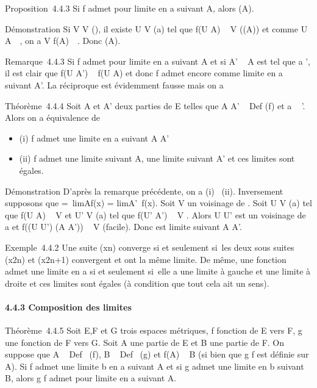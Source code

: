 Proposition~4.4.3 Si f admet \ell pour limite en a suivant A, alors \ell
\in\overlinef(A).

Démonstration Si V \in V (\ell), il existe U \in V (a) tel que f(U \bigcap A) \subset~ V
(\bigcapf(A)) et comme U \bigcap A\neq~\varnothing~, on a V \bigcap
f(A)\neq~\varnothing~. Donc \ell
\in\overlinef(A).

Remarque~4.4.3 Si f admet \ell pour limite en a suivant A et si A' \subset~ A est
tel que a \in\overlineA', il est clair que f(U \bigcap A') \subset~
f(U \bigcap A) et donc f admet encore \ell comme limite en a suivant A'. La
réciproque est évidemment fausse mais on a

Théorème~4.4.4 Soit A et A' deux parties de E telles que A \cup A'
\subset~ Def (f) et a \in\overlineA~
\bigcap\overlineA'. Alors on a équivalence de

\begin{itemize}
\itemsep1pt\parskip0pt
\item
  (i) f admet une limite en a suivant A \cup A'
\item
  (ii) f admet une limite suivant A, une limite suivant A' et ces
  limites sont égales.
\end{itemize}

Démonstration D'après la remarque précédente, on a (i) \rigtharrow~(ii).
Inversement supposons que \ell =\
limAf(x) = limA'~f(x). Soit
V un voisinage de \ell. Soit U \in V (a) tel que f(U \bigcap A) \subset~ V et U' \in V (a)
tel que f(U' \bigcap A') \subset~ V . Alors U \bigcap U' est un voisinage de a et f((U \bigcap
U') \bigcap (A \cup A')) \subset~ V (facile). Donc \ell est limite suivant A \cup A'.

Exemple~4.4.2 Une suite (xn) converge si et seulement si~les
deux sous suites (x2n) et (x2n+1) convergent et ont
la même limite. De même, une fonction admet une limite en a si et
seulement si~elle a une limite à gauche et une limite à droite et ces
limites sont égales (à condition que tout cela ait un sens).

\paragraph{4.4.3 Composition des limites}

Théorème~4.4.5 Soit E,F et G trois espaces métriques, f fonction de E
vers F, g une fonction de F vers G. Soit A une partie de E et B une
partie de F. On suppose que A \subset~ Def~ (f), B
\subset~ Def~ (g) et f(A) \subset~ B (si bien que g \cdot f est
définie sur A). Si f admet une limite b en a suivant A et si g admet une
limite \ell en b suivant B, alors g \cdot f admet \ell pour limite en a suivant A.

